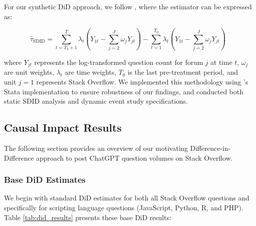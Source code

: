 For our synthetic DiD approach, we follow \textcite{arkhangelsky_synthetic_2021}, where the estimator can be expressed as:

\begin{equation}\label{eq:synthdid}
\hat{\tau}_{\text{SDID}} = \sum_{t=T_0+1}^T \lambda_t \left( Y_{1t} - \sum_{j=2}^J \omega_j Y_{jt} \right) - \sum_{t=1}^{T_0} \lambda_t \left( Y_{1t} - \sum_{j=2}^J \omega_j Y_{jt} \right)
\end{equation}

where $Y_{jt}$ represents the log-transformed question count for forum $j$ at time $t$, $\omega_j$ are unit weights, $\lambda_t$ are time weights, $T_0$ is the last pre-treatment period, and unit $j=1$ represents Stack Overflow. We implemented this methodology using \textcite{clarke_synthetic_2023, ciccia_short_2024}'s Stata implementation to ensure robustness of our findings, and conducted both static SDID analysis and dynamic event study specifications.


\subsection{Causal Impact Results}

The following section provides an overview of our motivating Difference-in-Difference approach to post ChatGPT question volumes on Stack Overflow.


\subsubsection{Base DiD Estimates}
We begin with standard DiD estimates for both all Stack Overflow questions and specifically for scripting language questions (JavaScript, Python, R, and PHP). Table \ref{tab:did_results} presents these base DiD results:

